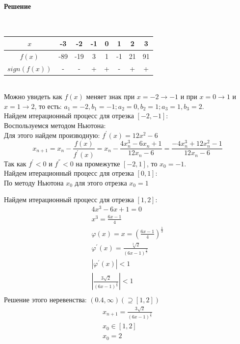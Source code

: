 \paragraph{Решение} ~\\[3mm]
\begin{tabular}{| c | c | c | c | c | c | c | c |}
  \hline
  $x$ & -3 & -2 & -1 & 0 & 1 & 2 & 3 \\
  \hline
  $f(x)$ & -89 & -19 & 3 & 1 & -1 & 21 & 91 \\
  \hline
  $sign(f(x))$ & - & - & + & + & - & + & + \\
  \hline
\end{tabular}\\[2mm]
Можно увидеть как $f(x)$ меняет знак при $x = -2 \rightarrow -1$ и при $x = 0 \rightarrow 1$ и $x = 1 \rightarrow 2$, то есть: $a_{1} = -2, b_{1} = -1; a_{2} = 0, b_{2} = 1; a_{3} = 1, b_{3} = 2$.\\[3mm]
Найдем итерационный процесс для отрезка $\left[-2, -1\right]$:\\
Воспользуемся методом Ньютона:\\
Для этого найдем производную: $f^{'}(x) = 12x^{2}-6$
\[
  x_{n+1} = x_{n} - \frac{f(x)}{f^{'}(x)} = x_{n} - \frac{4x_{n}^{3}-6x_{n}+1}{12x_{n}-6} = \frac{-4x_{n}^{3}+12x_{n}^{2}-1}{12x_{n}-6}
\]
Так как $f^{'} < 0$ и $f^{''} < 0$ на промежутке $\left[-2, 1\right]$, то $x_{0} = -1$.\\[3mm]
Найдем итерационный процесс для отрезка $\left[ 0, 1\right]$:\\
По методу Ньютона $x_{0}$ для этого отрезка $x_{0} = 1$

Найдем итерационный процесс для отрезка $\left[1, 2 \right]$:\\
\begin{gather*}
  4x^{3}-6x+1 = 0 \\
  x^{3} = \frac{6x-1}{4} \\
  \varphi(x) = x = \left(\frac{6x-1}{4}\right)^{\frac{1}{3}} \\
  \varphi^{'}(x) = \frac{\sqrt[3]{2}}{(6x-1)^{\frac{2}{3}}} \\
  |\varphi^{'}(x)| < 1 \\
  |\frac{3\sqrt{2}}{(6x-1)^{\frac{2}{3}}}| < 1 \\
\end{gather*}
Решение этого неревенства: $\left(0.4, \infty \right) (\supseteq \left[1, 2\right])$
\begin{gather*}
  x_{n+1} = \frac{3\sqrt{2}}{(6x-1)^{\frac{2}{3}}} \\
  x_{0} \in \left[1, 2 \right] \\
  x_{0} = 2
\end{gather*}


